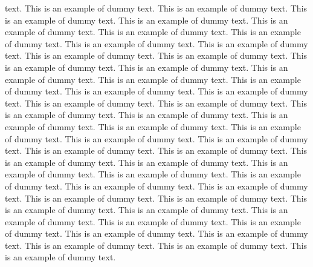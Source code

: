 \documentclass[lineno]{jfm}
\begin{document}
text. This is an example of dummy text. This is an example of dummy text. This is an example of dummy text. This is an example of dummy text. This is an example of dummy text. This is an example of dummy text. This is an example of dummy text. This is an example of dummy text. This is an example of dummy text. This is an example of dummy text. This is an example of dummy text. This is an example of dummy text. This is an example of dummy text. This is an example of dummy text. This is an example of dummy text. This is an example of dummy text. This is an example of dummy text. This is an example of dummy text. This is an example of dummy text. This is an example of dummy text. This is an example of dummy text. This is an example of dummy text. This is an example of dummy text. This is an example of dummy text. This is an example of dummy text. This is an example of dummy text. This is an example of dummy text. This is an example of dummy text. This is an example of dummy text. This is an example of dummy text. This is an example of dummy text. This is an example of dummy text. This is an example of dummy text. This is an example of dummy text. This is an example of dummy text. This is an example of dummy text. This is an example of dummy text. This is an example of dummy text. This is an example of dummy text. This is an example of dummy text. This is an example of dummy text. This is an example of dummy text. This is an example of dummy text. This is an example of dummy text. This is an example of dummy text. This is an example of dummy text. This is an example of dummy text. This is an example of dummy text.



\end{document}
